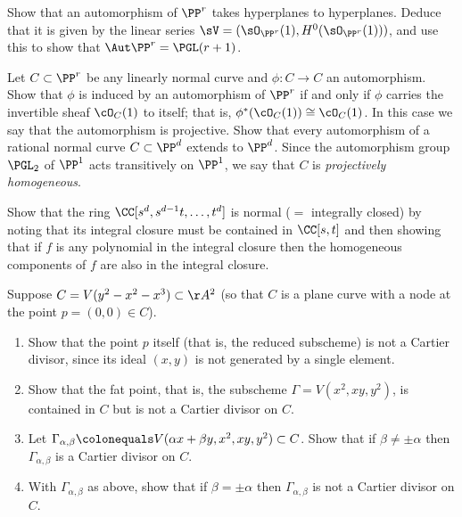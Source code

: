 \begin{exercise}\label{aut Pr}
Show that an automorphism of $\PP^r$ takes hyperplanes to hyperplanes. Deduce that it is given by the linear series
$\sV = (\sO_{\PP^r}(1), H^0(\sO_{\PP^r}(1)))$, and use this to show that $\Aut \PP^r = \PGL(r+1)$. 
\end{exercise}

\begin{exercise}\label{projective automorphism}
Let $C \subset \PP^r$ be any linearly normal curve and $\phi: C \to C$ an automorphism. Show that $\phi$ is induced by an automorphism of $\PP^r$ if and only if $\phi$ carries the invertible sheaf $\cO_{C}(1)$ to itself; that is, $\phi^*(\cO_{C}(1)) \cong \cO_{C}(1)$. In this case we say that the automorphism
is projective. Show that every automorphism of a rational normal curve $C \subset \PP^d$  extends to $\PP^d$. Since the
automorphism group $\PGL_2$ of $\PP^1$ acts transitively on $\PP^1$, we say that
$C$ is \emph{projectively homogeneous}.
\end{exercise}

\begin{exercise}\label{normality of RNC}
 Show that the ring $\CC[s^d,s^{d-1}t,\dots, t^d]$ is normal ($=$ integrally closed) by noting that its integral closure must be
 contained in $\CC[s,t]$ and then showing that if $f$ is any polynomial
 in the integral closure then the homogeneous components of $f$ are also in the integral closure.
\end{exercise}

\begin{exercise}\label{Cartier examples}
Suppose $C = V(y^2 - x^2 - x^3) \subset \AA^2$ (so that $C$ is a plane curve with a node at the point $p = (0,0) \in C$).
\begin{enumerate}
\item Show that the point $p$ itself (that is, the reduced subscheme) is not a Cartier divisor, since its ideal $(x,y)$ is not generated by a single element.
\item Show that the fat point, that is, the subscheme $\Gamma = V(x^2,
  xy, y^2)$, is contained in $C$ but is not a Cartier divisor on $C$.
\item Let $\Gamma_{\alpha, \beta} \colonequals
V(\alpha x + \beta y, x^2, xy, y^2) \subset C$.
Show that if $\beta \neq \pm \alpha$ then $\Gamma_{\alpha, \beta}$
is a Cartier divisor on $C$.
\item With $\Gamma_{\alpha, \beta}$ as above, show that if $\beta = \pm \alpha$ then $\Gamma_{\alpha, \beta}$ is not a Cartier divisor on $C$.
\end{enumerate}
\end{exercise}


